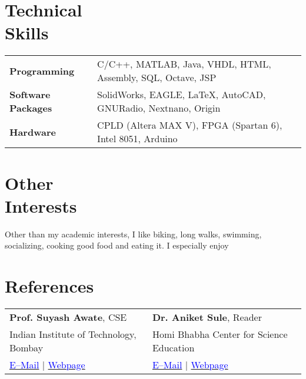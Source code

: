 \documentclass[margin,line]{res}
\begin{document}
\begin{resume}
\section{\sc Technical \\Skills} 
\begin{tabular}{@{}p{1.3in}p{4.3in}}
\textbf{Programming} & C/C++, MATLAB, Java, VHDL, HTML, Assembly, SQL, Octave, JSP \\  
\vspace*{-0.06in}
\textbf{Software Packages} & 
\vspace*{-0.06in}
SolidWorks, EAGLE, \LaTeX, AutoCAD, GNURadio, Nextnano, Origin\\ 
\vspace*{-0.06in}
\textbf{Hardware} &
\vspace*{-0.06in}
CPLD (Altera MAX V), FPGA (Spartan 6), Intel 8051, Arduino\\     
\end{tabular}

\section{\sc Other \\Interests}
Other than my academic interests, I like biking, long walks, swimming, socializing, cooking good food and eating it. I especially enjoy

\section{\sc References} 
\begin{tabular}{@{}p{3in}p{3in}}
\textbf{Prof. Suyash Awate}, CSE & \textbf{Dr. Aniket Sule}, Reader \\ 
Indian Institute of Technology, Bombay & Homi Bhabha Center for Science Education \\
\href{mailto:suyash@cse.iitb.ac.in}{\textcolor{blue}{E--Mail}} $|$ \href{https://www.cse.iitb.ac.in/~suyash}{\textcolor{blue}{Webpage}} & \href{mailto:anikets@hbcse.tifr.res.in}{\textcolor{blue}{E--Mail}} $|$ \href{http://www.hbcse.tifr.res.in/people/academic/aniket-sule}{\textcolor{blue}{Webpage}}\\
\end{tabular}
\end{resume}
\end{document}
